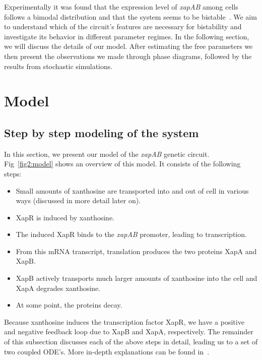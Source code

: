 \documentclass[10pt,letterpaper]{article}
\begin{document}
Experimentally it was found that the expression level of \emph{xapAB} among
cells follows a bimodal distribution and that the system seems to be
bistable~\cite{Chure2019}. We aim to understand which of the circuit's
features are necessary for bistability and investigate its behavior in
different parameter regimes. In the following section, we will discuss the
details of our model. After estimating the free parameters we then present
the observations we made through phase diagrams, followed by the results
from stochastic simulations.


\section*{Model}
\subsection*{Step by step modeling of the system}
In this section, we present our model of the \emph{xapAB} genetic circuit.
Fig~\ref{fig2:model} shows an overview of this model. It consists of the
following steps: 
\begin{itemize}
	\item Small amounts of xanthosine are transported into and out of cell in various ways (discussed in more detail later on).
	\item XapR is induced by xanthosine.
	\item The induced XapR binds to the \emph{xapAB} promoter, leading to transcription.
	\item From this mRNA transcript, translation produces the two proteins XapA and XapB.
	\item XapB actively transports much larger amounts of xanthosine into the cell and XapA degrades xanthosine.
	\item At some point, the proteins decay.
\end{itemize}
Because xanthosine induces the transcription factor XapR, we have a positive
and negative feedback loop due to XapB and XapA, respectively. The remainder
of this subsection discusses each of the above steps in detail, leading us
to a set of two coupled ODE's. More in-depth explanations can be found
in~.
\end{document}
